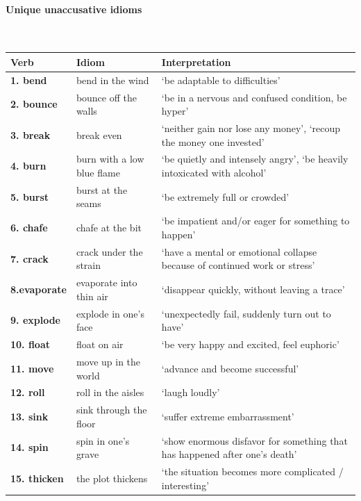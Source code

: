 \documentclass[output=paper]{langsci/langscibook}
\begin{document}
\begin{subappendices}

\paragraph*{Unique unaccusative idioms}\leavevmode\\[.5\baselineskip]
{\smaller
\begin{tabularx}{\textwidth}{llX}
{\bfseries Verb} & {\bfseries Idiom} & {\bfseries Interpretation} \\
\midrule
{\bfseries 1. bend}  & bend in the wind & ‘be adaptable to difficulties’\\
{\bfseries 2. bounce}  & bounce off the walls & ‘be in a nervous and confused condition, be hyper’\\
{\bfseries 3. break}  & break even & ‘neither gain nor lose any money’, ‘recoup the money one invested’\\
{\bfseries 4. burn}  & burn with a low blue flame & ‘be quietly and intensely angry’, ‘be heavily intoxicated with alcohol’ \\
{\bfseries 5. burst}  & burst at the seams & ‘be extremely full or crowded’  \\
{\bfseries 6. chafe}  & chafe at the bit & ‘be impatient and/or eager for something to happen’\\
{\bfseries 7. crack}  & crack under the strain & ‘have a mental or emotional collapse because of continued work or stress’\\
{\bfseries 8.evaporate} & evaporate into thin air & ‘disappear quickly, without leaving a trace’\\
{\bfseries 9. explode}  & explode in one’s face & ‘unexpectedly fail, suddenly turn out to have’\\
{\bfseries 10. float}  & float on air & ‘be very happy and excited, feel euphoric’\\
{\bfseries 11. move}  & move up in the world & ‘advance and become successful’ \\
{\bfseries 12. roll}  & roll in the aisles & ‘laugh loudly’ \\
{\bfseries 13. sink} & sink through the floor & ‘suffer extreme embarrassment’\\
{\bfseries 14. spin}  & spin in one’s grave & ‘show enormous disfavor for something that has happened after one's death’\\
{\bfseries 15. thicken}  & the plot thickens & ‘the situation becomes more complicated /  interesting’\\
\end{tabularx}
}


\end{subappendices}
\end{document}
